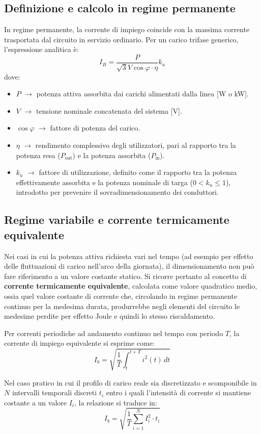 \subsection{Definizione e calcolo in regime permanente}
In regime permanente, la corrente di impiego coincide con la massima corrente trasportata dal circuito in servizio ordinario. Per un carico trifase generico, l'espressione analitica è:
\[ I_B = \frac{P}{\sqrt{3} V \cos\varphi \cdot \eta} k_u \]
dove:
\begin{itemize}
    \item \textbf{$P$} $\rightarrow$ potenza attiva assorbita dai carichi alimentati dalla linea [W o kW].
    \item \textbf{$V$} $\rightarrow$ tensione nominale concatenata del sistema [V].
    \item \textbf{$\cos\varphi$} $\rightarrow$ fattore di potenza del carico.
    \item \textbf{$\eta$} $\rightarrow$ rendimento complessivo degli utilizzatori, pari al rapporto tra la potenza resa ($P_{\text{out}}$) e la potenza assorbita ($P_{\text{in}}$).
    \item \textbf{$k_u$} $\rightarrow$ fattore di utilizzazione, definito come il rapporto tra la potenza effettivamente assorbita e la potenza nominale di targa ($0 < k_u \le 1$), introdotto per prevenire il sovradimensionamento dei conduttori.
\end{itemize}

\subsection{Regime variabile e corrente termicamente equivalente}
Nei casi in cui la potenza attiva richiesta vari nel tempo (ad esempio per effetto delle fluttuazioni di carico nell'arco della giornata), il dimensionamento non può fare riferimento a un valore costante statico. Si ricorre pertanto al concetto di \textbf{corrente termicamente equivalente}, calcolata come valore quadratico medio, ossia quel valore costante di corrente che, circolando in regime permanente continuo per la medesima durata, produrrebbe negli elementi del circuito le medesime perdite per effetto Joule e quindi lo stesso riscaldamento.

Per correnti periodiche ad andamento continuo nel tempo con periodo $T$, la corrente di impiego equivalente si esprime come:
\[ I_b = \sqrt{\frac{1}{T} \int_{t}^{t+T} i^2(t) \, dt} \]

Nel caso pratico in cui il profilo di carico reale sia discretizzato e scomponibile in $N$ intervalli temporali discreti $t_i$ entro i quali l'intensità di corrente si mantiene costante a un valore $I_i$, la relazione si traduce in:
\[ I_b = \sqrt{\frac{1}{T} \sum_{i=1}^{N} I_i^2 \cdot t_i} \]

